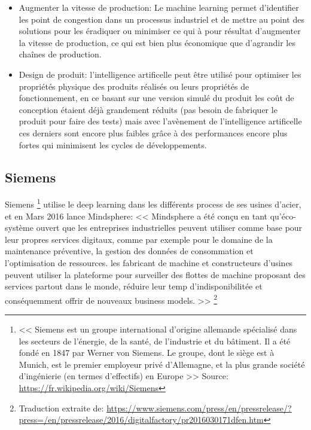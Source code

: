\begin{itemize}
            \item Augmenter la vitesse de production: Le machine learning permet d'identifier les point 
            de congestion dans un processus industriel et de mettre au point des solutions pour les éradiquer 
            ou minimiser ce qui à pour résultat d'augmenter la vitesse de production, ce qui est bien 
            plus économique que d'agrandir les chaînes de production. \newline 

            \item Design de produit: l'intelligence artificelle peut être utilisé pour optimiser les propriétés 
            physique des produits réalisés ou leurs propriétés de fonctionnement, en ce basant sur une
            version simulé du produit les coût de conception étaient déjà grandement réduits 
            (pas besoin de fabriquer le produit pour faire des tests) mais avec l'avènement de 
            l'intelligence artificelle ces derniers sont encore plus faibles grâce à des performances
            encore plus fortes qui minimisent les cycles de développements.
            \newline
        \end{itemize}

        \subsection*{Siemens}
            Siemens \footnote{<< Siemens est un groupe 
            international d’origine allemande spécialisé dans les secteurs de l'énergie, 
            de la santé, de l'industrie et du bâtiment. 
            Il a été fondé en 1847 par Werner von Siemens. 
            Le groupe, dont le siège est à Munich, est le premier employeur privé d'Allemagne, 
            et la plus grande société d'ingénierie (en termes d'effectifs) en Europe >> 
            Source: \url{https://fr.wikipedia.org/wiki/Siemens}}
            utilise le deep learning dans les différents process de ses usines d'acier,
            et en Mars 2016 lance Mindsphere: 
            << Mindsphere a été conçu en tant qu'éco-système ouvert que les entreprises industrielles
            peuvent utiliser comme base pour leur propres services digitaux, comme par exemple pour 
            le domaine de la maintenance préventive, la gestion des données de consommation et 
            l'optimisation de ressources. les fabricant de machine et constructeurs d'usines
            peuvent utiliser la plateforme pour surveiller des flottes de machine proposant des
            services partout dans le monde, réduire leur temp d'indisponibilitée et 
            conséquemment offrir de nouveaux business models. >> 
            \footnote{Traduction extraite de: \url{https://www.siemens.com/press/en/pressrelease/?press=/en/pressrelease/2016/digitalfactory/pr2016030171dfen.htm}}
            \newline

